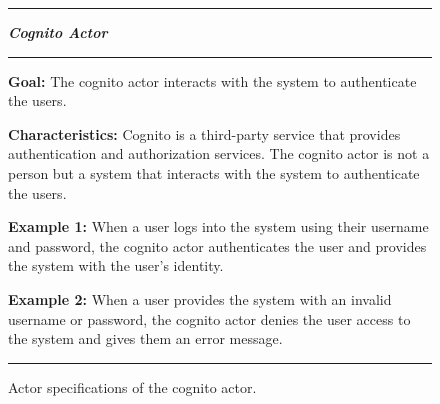 \begin{figure}[H]
    \noindent
    \rule{\textwidth}{0.4pt}
    \begin{center}
        \noindent
        \textit{\textbf{Cognito Actor}}
    \end{center}

    \noindent
    \rule{\textwidth}{0.4pt}

    \noindent
    \textbf{Goal:} The cognito actor interacts with the system to authenticate the users.
    \newline

    \noindent
    \textbf{Characteristics:} Cognito is a third-party service that provides authentication and authorization services.
    The cognito actor is not a person but a system that interacts with the system to authenticate the users.
    \newline

    \noindent
    \textbf{Example 1:} When a user logs into the system using their username and password, the cognito actor
    authenticates the user and provides the system with the user's identity.
    \newline

    \noindent
    \textbf{Example 2:} When a user provides the system with an invalid username or password, the cognito actor
    denies the user access to the system and gives them an error message.

    \noindent
    \rule{\textwidth}{0.4pt}

    \caption{Actor specifications of the cognito actor.
    }\label{fig:actor-cognito}
\end{figure}
